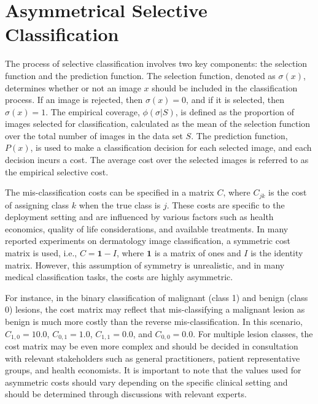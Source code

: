 \section{Asymmetrical Selective Classification}
\label{sec:selective_classification}
The process of selective classification involves two key components: the selection function and the prediction function. The selection function, denoted as $\sigma(x)$, determines whether or not an image $x$ should be included in the classification process. If an image is rejected, then $\sigma(x)=0$, and if it is selected, then $\sigma(x)=1$. The empirical coverage, $\phi(\sigma|S)$, is defined as the proportion of images selected for classification, calculated as the mean of the selection function over the total number of images in the data set $S$. The prediction function, $P(x)$, is used to make a classification decision for each selected image, and each decision incurs a cost. The average cost over the selected images is referred to as the empirical selective cost.

The mis-classification costs can be specified in a matrix $C$, where $C_{jk}$ is the cost of assigning class $k$ when the true class is $j$. These costs are specific to the deployment setting and are influenced by various factors such as health economics, quality of life considerations, and available treatments. In many reported experiments on dermatology image classification, a symmetric cost matrix is used, i.e., $C = \mathbf{1} - I$, where $\mathbf{1}$ is a matrix of ones and $I$ is the identity matrix. However, this assumption of symmetry is unrealistic, and in many medical classification tasks, the costs are highly asymmetric.

For instance, in the binary classification of malignant (class 1) and benign (class 0) lesions, the cost matrix may reflect that mis-classifying a malignant lesion as benign is much more costly than the reverse mis-classification. In this scenario, $C_{1,0} = 10.0$, $C_{0,1} = 1.0$, $C_{1,1} = 0.0$, and $C_{0,0} = 0.0$. For multiple lesion classes, the cost matrix may be even more complex and should be decided in consultation with relevant stakeholders such as general practitioners, patient representative groups, and health economists. It is important to note that the values used for asymmetric costs should vary depending on the specific clinical setting and should be determined through discussions with relevant experts.

